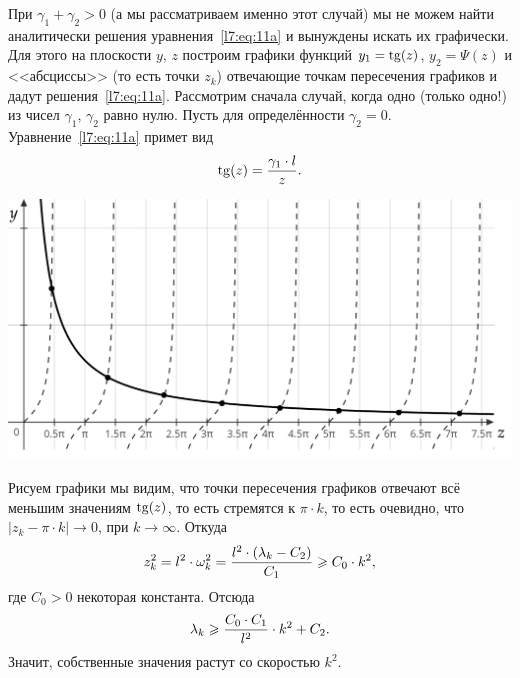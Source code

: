 \noindent При $\gamma_1+\gamma_2>0$ (а мы рассматриваем именно этот случай) мы не можем найти аналитически решения уравнения~\eqref{l7:eq:11a} и вынуждены искать их графически. Для этого на плоскости $y,\,z$ построим графики функций $y_1=\operatorname{tg}(z)$, $y_2=\Psi(z)$ и  <<абсциссы>> (то есть точки $z_k$) отвечающие точкам пересечения графиков и дадут решения~\eqref{l7:eq:11a}. Рассмотрим сначала случай, когда одно (только одно!) из чисел $\gamma_1,\,\gamma_2$ равно нулю. Пусть для определённости $\gamma_2=0$. Уравнение~\eqref{l7:eq:11a} примет вид
\begin{equation*}
	\hfill\Tg(z)=\dfrac{\gamma_1\cdot l}{z}.\hfill
\end{equation*}
\begin{center}
	\includegraphics[width=0.7\linewidth]{picture1}
\end{center}
Рисуем графики мы видим, что точки пересечения графиков отвечают всё меньшим значениям $\operatorname{tg}(z)$, то есть стремятся к $\pi\cdot k$, то есть очевидно, что $|z_k-\pi\cdot  k|\to0$, при $k\to\infty$. Откуда
\begin{equation*}
	\hfill z_k^2=l^2\cdot\omega_k^2=\dfrac{l^2\cdot(\lambda_k-C_2)}{C_1}\geqslant C_0\cdot k^2,\hfill
\end{equation*}	
где $C_0>0$ некоторая константа. Отсюда
\begin{equation*}
	\hfill\lambda_k\geqslant\frac{C_0\cdot C_1}{l^2}\cdot k^2+C_2.\hfill
\end{equation*}
Значит, собственные значения растут со скоростью $k^2$.

